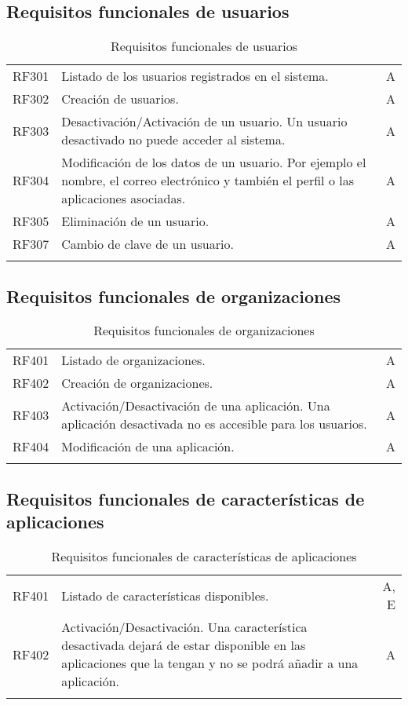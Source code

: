 \subsection{Requisitos funcionales de usuarios}
\label{cuadro:requisitos-funcionales-de-usuarios}
\begin{longtable}{l|p{13cm}|r}
  RF301\label{RF301} & Listado de los usuarios registrados en el sistema. & A \\
  RF302\label{RF302} & Creación de usuarios. & A \\
  RF303\label{RF303} & Desactivación/Activación de un usuario. Un usuario desactivado no puede acceder al sistema. & A \\
  RF304\label{RF304} & Modificación de los datos de un usuario. Por ejemplo el nombre, el correo electrónico y también el perfil o las aplicaciones asociadas. & A \\
  RF305\label{RF305} & Eliminación de un usuario. & A \\
  RF307\label{RF307} & Cambio de clave de un usuario. & A \\
  \caption{Requisitos funcionales de usuarios} \\
\end{longtable}

\subsection{Requisitos funcionales de organizaciones}
\label{cuadro:requisitos-funcionales-de-organizaciones}
\begin{longtable}{l|p{13cm}|r}
  RF401\label{RF401} & Listado de organizaciones. & A \\
  RF402\label{RF402} & Creación de organizaciones. & A \\
  RF403\label{RF403} & Activación/Desactivación de una aplicación. Una aplicación desactivada no es accesible para los usuarios. & A \\
  RF404\label{RF404} & Modificación de una aplicación. & A \\
  \caption{Requisitos funcionales de organizaciones} \\
\end{longtable}

\subsection{Requisitos funcionales de características de aplicaciones}
\label{cuadro:requisitos-funcionales-de-aplicaciones}
\begin{longtable}{l|p{13cm}|r}
  RF401\label{RF401} & Listado de características disponibles. & A, E \\
  RF402\label{RF402} & Activación/Desactivación. Una característica desactivada dejará de estar disponible en las aplicaciones que la tengan y no se podrá añadir a una aplicación. & A \\
  \caption{Requisitos funcionales de características de aplicaciones} \\
\end{longtable}

